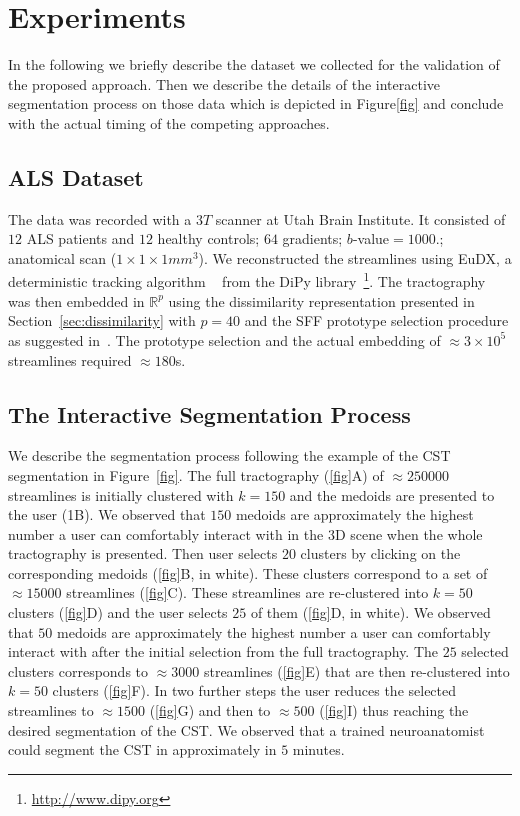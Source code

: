 \section{Experiments}
\label{sec:experiments}
In the following we briefly describe the dataset we collected for the
validation of the proposed approach. Then we describe the details of
the interactive segmentation process on those data which is depicted
in Figure\ref{fig} and conclude with the actual timing of the
competing approaches.

\subsection{ALS Dataset}
\label{sec:dataset}
The data was recorded with a $3T$ scanner at Utah Brain Institute. It
consisted of $12$ ALS patients and $12$ healthy controls; $64$
gradients; $b$-value$=1000$.; anatomical scan ($1 \times 1 \times
1mm^3$).  We reconstructed the streamlines using EuDX, a deterministic
tracking algorithm ~\cite{garyfallidis2012towards} from the DiPy
library~\footnote{\url{http://www.dipy.org}}. The tractography was
then embedded in $\mathbb{R}^{p}$ using the dissimilarity
representation presented in Section~\ref{sec:dissimilarity} with
$p=40$ and the SFF prototype selection procedure as suggested
in~\cite{olivetti2012approximation}. The prototype selection and the
actual embedding of $\approx 3 \times 10^5$ streamlines required
$\approx 180$s.


\subsection{The Interactive Segmentation Process}
We describe the segmentation process following the example of the CST
segmentation in Figure~\ref{fig}. The full tractography (\ref{fig}A)
of $\approx 250000$ streamlines is initially clustered with $k=150$
and the medoids are presented to the user (1B). We observed that $150$
medoids are approximately the highest number a user can comfortably
interact with in the $3$D scene when the whole tractography is
presented. Then user selects $20$ clusters by clicking on the
corresponding medoids (\ref{fig}B, in white). These clusters
correspond to a set of $\approx 15000$ streamlines (\ref{fig}C). These
streamlines are re-clustered into $k=50$ clusters (\ref{fig}D) and the
user selects $25$ of them (\ref{fig}D, in white). We observed that
$50$ medoids are approximately the highest number a user can
comfortably interact with after the initial selection from the full
tractography. The $25$ selected clusters corresponds to $\approx 3000$
streamlines (\ref{fig}E) that are then re-clustered into $k=50$
clusters (\ref{fig}F). In two further steps the user reduces the
selected streamlines to $\approx 1500$ (\ref{fig}G) and then to
$\approx 500$ (\ref{fig}I) thus reaching the desired segmentation of
the CST. We observed that a trained neuroanatomist could segment the
CST in approximately in $5$ minutes.

